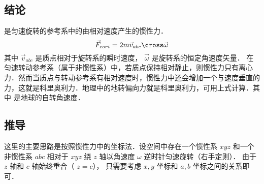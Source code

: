 

\subsection{结论}
是匀速旋转的参考系中的由相对速度产生的惯性力．
\begin{equation}
\vec F_{cori} = 2m \vec v_{abc} \cross \vec \omega
\end{equation}
其中 $\vec v_{abc}$ 是质点相对于旋转系的瞬时速度， $\vec\omega$ 是旋转系的恒定角速度矢量．%
在匀速转动参考系（属于非惯性系）中，若质点保持相对静止，则惯性力只有离心力．然而当质点与转动参考系有相对速度时，惯性力中还会增加一个与速度垂直的力，这就是科里奥利力．地理中的地转偏向力就是科里奥利力，可用上式计算．其中 是地球的自转角速度．

\subsection{推导}
这里的主要思路是按照惯性力中的坐标法．设空间中存在一个惯性系 $xyz$ 和一个非惯性系 $abc$ 相对于 $xyz$ 绕 $z$ 轴以角速度 $\omega$ 逆时针匀速旋转（右手定则）．%
由于 $z$ 轴和 $c$ 轴始终重合（ $z=c$）， 只需要考虑 $x,y$ 坐标和 $a,b$ 坐标之间的关系即可．

